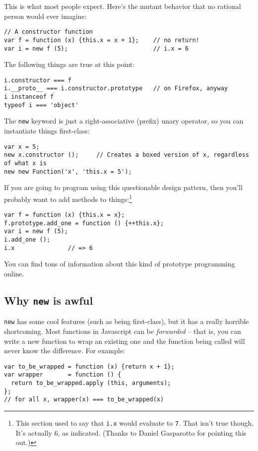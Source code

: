 \documentclass{article}
\begin{document}
  This is what most people expect. Here's the mutant behavior that no rational person would ever imagine:

\begin{verbatim}
// A constructor function
var f = function (x) {this.x = x + 1};    // no return!
var i = new f (5);                        // i.x = 6
\end{verbatim}

  The following things are true at this point:

\begin{verbatim}
i.constructor === f
i.__proto__ === i.constructor.prototype   // on Firefox, anyway
i instanceof f
typeof i === 'object'
\end{verbatim}

  The \verb|new| keyword is just a right-associative (prefix) unary operator, so you can instantiate things first-class:

\begin{verbatim}
var x = 5;
new x.constructor ();     // Creates a boxed version of x, regardless of what x is
new new Function('x', 'this.x = 5');
\end{verbatim}

  If you are going to program using this questionable design pattern, then you'll probably want to add methods to things:\footnote{This section used to say that {\tt i.x} would evaluate to
  {\tt 7}. That isn't true though. It's actually 6, as indicated. (Thanks to Daniel Gasparotto for pointing this out.)}

\begin{verbatim}
var f = function (x) {this.x = x};
f.prototype.add_one = function () {++this.x};
var i = new f (5);
i.add_one ();
i.x               // => 6
\end{verbatim}

  You can find tons of information about this kind of prototype programming online.

\subsection {Why {\tt new} is awful}
    {\tt new} has some cool features (such as being first-class), but it has a really horrible shortcoming. Most functions in Javascript can be {\it forwarded} -- that is, you can write a new
    function to wrap an existing one and the function being called will never know the difference. For example:

\begin{verbatim}
var to_be_wrapped = function (x) {return x + 1};
var wrapper       = function () {
  return to_be_wrapped.apply (this, arguments);
};
// for all x, wrapper(x) === to_be_wrapped(x)
\end{verbatim}
\end{document}

